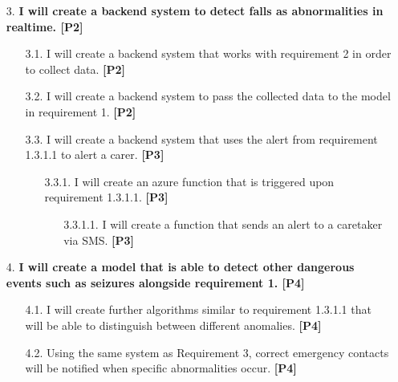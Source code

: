 \begin{enumerate}
    \item[3.] \textbf{I will create a backend system to detect falls as abnormalities in realtime. [P2]}
    \begin{enumerate}[label*=\arabic*.]
        \item[3.1.] I will create a backend system that works with requirement 2 in order to collect data. \textbf{[P2]}
    \end{enumerate}
    \begin{enumerate}[label*=\arabic*.]
        \item[3.2.] I will create a backend system to pass the collected data to the model in requirement 1. \textbf{[P2]}
    \end{enumerate}
    \begin{enumerate}[label*=\arabic*.]
        \item[3.3.] I will create a backend system that uses the alert from requirement 1.3.1.1 to alert a carer. \textbf{[P3]}
        \begin{enumerate}[label*=\arabic*.]
            \item[3.3.1.] I will create an azure function that is triggered upon requirement 1.3.1.1. \textbf{[P3]}
            \begin{enumerate}[label*=\arabic*.]
                \item[3.3.1.1.] I will create a function that sends an alert to a caretaker via SMS. \textbf{[P3]}
            \end{enumerate}
        \end{enumerate}
    \end{enumerate}
    
    \item[4.] \textbf{I will create a model that is able to detect other dangerous events such as seizures alongside requirement 1. [P4]}
    \begin{enumerate}[label*=\arabic*.]
        \item[4.1.] I will create further algorithms similar to requirement 1.3.1.1 that will be able to distinguish between different anomalies. \textbf{[P4]}
    \end{enumerate}
    \begin{enumerate}[label*=\arabic*.]
        \item[4.2.] Using the same system as Requirement 3, correct emergency contacts will be notified when specific abnormalities occur. \textbf{[P4]}
    \end{enumerate}
\end{enumerate}

